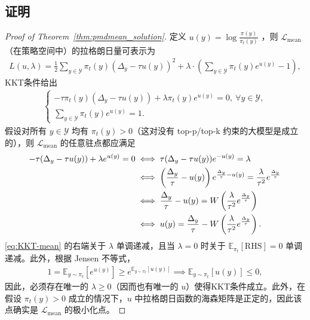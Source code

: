 \documentclass{article}
\theoremstyle{plain}
\theoremstyle{definition}
\theoremstyle{remark}
\begin{document}
\subsection{证明 }
\label{sec:proof_thm1}
\begin{proof}[Proof of Theorem~\ref{thm:pmdmean_solution}]
    定义 $u(y)=\log\frac{\pi(y)}{\pi_t(y)}$ ，则 $\mathcal{L}_{\mathrm{mean}}$  （在策略空间中）的拉格朗日量可表示为
    \begin{align*}
        L(u,\lambda)=\frac{1}{2}\sum_{y\in\mathcal{Y}}\pi_t(y)(\Delta_y-\tau u(y))^2 + \lambda\cdot\left(\sum_{y\in\mathcal{Y}}\pi_t(y)e^{u(y)}-1\right),
    \end{align*}
    KKT条件给出 
    \begin{align*}
        \begin{cases}-\tau\pi_t(y)(\Delta_y-\tau u(y)) + \lambda\pi_t(y)e^{u(y)}=0,~\forall y\in\mathcal{Y},\\
        \sum_{y\in\mathcal{Y}}\pi_t(y)e^{u(y)}=1.
        \end{cases}
    \end{align*}
    假设对所有 $y\in\mathcal{Y}$  均有 $\pi_t(y)>0$（这对没有 top-p/top-k 约束的大模型是成立的），则 $\mathcal{L}_{\mathrm{mean}}$  的任意驻点都应满足 
    \begin{align}
        -\tau(\Delta_y-\tau u(y))+\lambda e^{u(y)}=0
        &\iff \tau(\Delta_y-\tau u(y))e^{-u(y)}=\lambda\notag\\
        &\iff \left(\frac{\Delta_y}{\tau}-u(y)\right)e^{\frac{\Delta_y}{\tau}-u(y)}=\frac{\lambda}{\tau^2}e^{\frac{\Delta_y}{\tau}}\notag\\
        &\iff \frac{\Delta_y}{\tau}-u(y)=W\left(\frac{\lambda}{\tau^2}e^{\frac{\Delta_y}{\tau}}\right)\notag\\
        &\iff u(y)=\frac{\Delta_y}{\tau}-W\left(\frac{\lambda}{\tau^2}e^{\frac{\Delta_y}{\tau}}\right).\label{eq:KKT-mean}
    \end{align}
    \eqref{eq:KKT-mean} 的右端关于 $\lambda$ 单调递减，且当 $\lambda=0$ 时关于 $\mathbb{E}_{\pi_t}[\text{RHS}]=0$ 单调递减。此外，根据 Jensen 不等式， 
    \begin{align*}
    1=\mathbb{E}_{y\sim\pi_t}[e^{u(y)}]\geq e^{\mathbb{E}_{y\sim\pi_t}[u(y)]}\implies\mathbb{E}_{y\sim\pi_t}[u(y)]\leq 0,
    \end{align*}
    因此，必须存在唯一的 $\lambda\geq 0$（因而也有唯一的 $u$）使得KKT条件成立。此外，在假设 $\pi_t(y)>0$ 成立的情况下，$u$ 中拉格朗日函数的海森矩阵是正定的，因此该点确实是 $\mathcal{L}_{\mathrm{mean}}$ 的极小化点。 


\end{proof}
\end{document}
